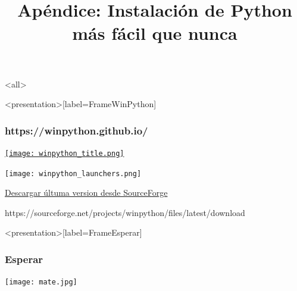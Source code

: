 \mode<all>









\title{
    Apéndice: Instalación de Python más fácil que nunca}
\subject{Apéndice: Instalación de Python más fácil que nunca}
\setlength\fboxsep{0pt}
\setlength\fboxrule{5pt}




\begin{frame}<presentation>[label=FrameWinPython]
  \frametitle{https://winpython.github.io/}
  \center
  \href{https://winpython.github.io/}{ 
  \texttt{[image: winpython\_title.png]}
  }

  \texttt{[image: winpython\_launchers.png]}

  \href{https://sourceforge.net/projects/winpython/files/latest/download}{Descargar últuma version desde SourceForge}

  \tiny https://sourceforge.net/projects/winpython/files/latest/download
\end{frame}

\begin{frame}<presentation>[label=FrameEsperar]
  \frametitle{Esperar}
\center
  \texttt{[image: mate.jpg]}

\end{frame}

